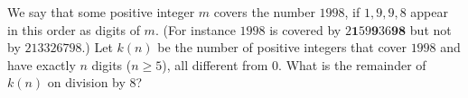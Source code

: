 We say that some positive integer $m$ covers the number $1998$,  if $1,9,9,8$ appear in this order as digits of $m$. (For instance $1998$ is covered by $2\textbf{1}59\textbf{9}36\textbf{98}$ but not by $213326798$.) Let $k(n)$ be the number of positive integers that cover $1998$ and have exactly $n$ digits ($n\ge 5$), all different from $0$. What is the remainder of $k(n)$ on division by $8$?